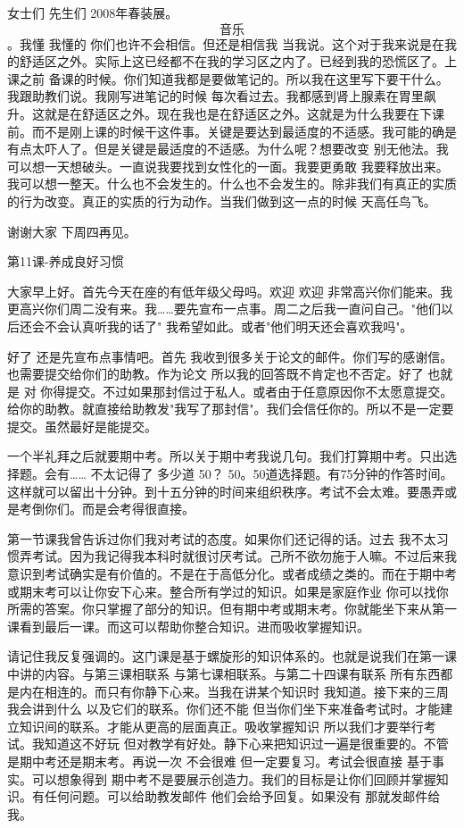 女士们 先生们 2008年春装展。\[音乐\]。我懂 我懂的 你们也许不会相信。但还是相信我 当我说。这个对于我来说是在我的舒适区之外。实际上这已经都不在我的学习区之内了。已经到我的恐慌区了。上课之前 备课的时候。你们知道我都是要做笔记的。所以我在这里写下要干什么。我跟助教们说。我刚写进笔记的时候 每次看过去。我都感到肾上腺素在胃里飙升。这就是在舒适区之外。现在我也是在舒适区之外。这就是为什么我要在下课前。而不是刚上课的时候干这件事。关键是要达到最适度的不适感。我可能的确是有点太吓人了。但是关键是最适度的不适感。为什么呢？想要改变 别无他法。我可以想一天想破头。一直说我要找到女性化的一面。我要更勇敢 我要释放出来。我可以想一整天。什么也不会发生的。什么也不会发生的。除非我们有真正的实质的行为改变。真正的实质的行为动作。当我们做到这一点的时候 天高任鸟飞。 

谢谢大家 下周四再见。 

第11课-养成良好习惯 

大家早上好。首先今天在座的有低年级父母吗。欢迎 欢迎 非常高兴你们能来。我更高兴你们周二没有来。我……要先宣布一点事。周二之后我一直问自己。"他们以后还会不会认真听我的话了" 我希望如此。或者"他们明天还会喜欢我吗"。 

好了 还是先宣布点事情吧。首先 我收到很多关于论文的邮件。你们写的感谢信。也需要提交给你们的助教。作为论文 所以我的回答既不肯定也不否定。好了 也就是 对 你得提交。不过如果那封信过于私人。或者由于任意原因你不太愿意提交。给你的助教。就直接给助教发"我写了那封信"。我们会信任你的。所以不是一定要提交。虽然最好是能提交。 

一个半礼拜之后就要期中考。所以关于期中考我说几句。我们打算期中考。只出选择题。会有…… 不太记得了 多少道 50？ 50。50道选择题。有75分钟的作答时间。这样就可以留出十分钟。到十五分钟的时间来组织秩序。考试不会太难。要愚弄或是考倒你们。而是会考得很直接。 

第一节课我曾告诉过你们我对考试的态度。如果你们还记得的话。过去 我不太习惯弄考试。因为我记得我本科时就很讨厌考试。己所不欲勿施于人嘛。不过后来我意识到考试确实是有价值的。不是在于高低分化。或者成绩之类的。而在于期中考或期末考可以让你安下心来。整合所有学过的知识。如果是家庭作业 你可以找你所需的答案。你只掌握了部分的知识。但有期中考或期末考。你就能坐下来从第一课看到最后一课。而这可以帮助你整合知识。进而吸收掌握知识。 

请记住我反复强调的。这门课是基于螺旋形的知识体系的。也就是说我们在第一课中讲的内容。与第三课相联系 与第七课相联系。与第二十四课有联系 所有东西都是内在相连的。而只有你静下心来。当我在讲某个知识时 我知道。接下来的三周我会讲到什么 以及它们的联系。你们还不能 但当你们坐下来准备考试时。才能建立知识间的联系。才能从更高的层面真正。吸收掌握知识 所以我们才要举行考试。我知道这不好玩 但对教学有好处。静下心来把知识过一遍是很重要的。不管是期中考还是期末考。再说一次 不会很难 但一定要复习。考试会很直接 基于事实。可以想象得到 期中考不是要展示创造力。我们的目标是让你们回顾并掌握知识。有任何问题。可以给助教发邮件 他们会给予回复。如果没有 那就发邮件给我。 

